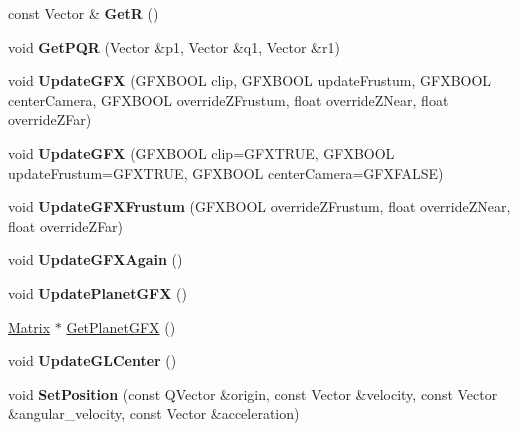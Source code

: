 \begin{DoxyCompactItemize}
\item 
const Vector \& {\bfseries GetR} ()\hypertarget{classCamera_a070588d0684768534f8bbbe9cfc80ce4}{}\label{classCamera_a070588d0684768534f8bbbe9cfc80ce4}

\item 
void {\bfseries Get\+P\+QR} (Vector \&p1, Vector \&q1, Vector \&r1)\hypertarget{classCamera_ad53fce5afb44f52fed1cbc04dcc78116}{}\label{classCamera_ad53fce5afb44f52fed1cbc04dcc78116}

\item 
void {\bfseries Update\+G\+FX} (G\+F\+X\+B\+O\+OL clip, G\+F\+X\+B\+O\+OL update\+Frustum, G\+F\+X\+B\+O\+OL center\+Camera, G\+F\+X\+B\+O\+OL override\+Z\+Frustum, float override\+Z\+Near, float override\+Z\+Far)\hypertarget{classCamera_a34033fc30cb7ab719872ae8e950e6f56}{}\label{classCamera_a34033fc30cb7ab719872ae8e950e6f56}

\item 
void {\bfseries Update\+G\+FX} (G\+F\+X\+B\+O\+OL clip=G\+F\+X\+T\+R\+UE, G\+F\+X\+B\+O\+OL update\+Frustum=G\+F\+X\+T\+R\+UE, G\+F\+X\+B\+O\+OL center\+Camera=G\+F\+X\+F\+A\+L\+SE)\hypertarget{classCamera_a4bd104f3c72ada744287bdef41bbf149}{}\label{classCamera_a4bd104f3c72ada744287bdef41bbf149}

\item 
void {\bfseries Update\+G\+F\+X\+Frustum} (G\+F\+X\+B\+O\+OL override\+Z\+Frustum, float override\+Z\+Near, float override\+Z\+Far)\hypertarget{classCamera_ab17457938679c559f7079798d1861fcf}{}\label{classCamera_ab17457938679c559f7079798d1861fcf}

\item 
void {\bfseries Update\+G\+F\+X\+Again} ()\hypertarget{classCamera_ae7b6b57f519565f4863b3293899bf625}{}\label{classCamera_ae7b6b57f519565f4863b3293899bf625}

\item 
void {\bfseries Update\+Planet\+G\+FX} ()\hypertarget{classCamera_a86aa1e55c74d1219cdac7b2de1f6c1a5}{}\label{classCamera_a86aa1e55c74d1219cdac7b2de1f6c1a5}

\item 
\hyperlink{classMatrix}{Matrix} $\ast$ \hyperlink{classCamera_a4263186b84618f0403eff92c8c147c0b}{Get\+Planet\+G\+FX} ()
\item 
void {\bfseries Update\+G\+L\+Center} ()\hypertarget{classCamera_a24e03f195cf366d41695d5b8900afd7d}{}\label{classCamera_a24e03f195cf366d41695d5b8900afd7d}

\item 
void {\bfseries Set\+Position} (const Q\+Vector \&origin, const Vector \&velocity, const Vector \&angular\+\_\+velocity, const Vector \&acceleration)\hypertarget{classCamera_a4f0575898ea040a2932702f3ac703be9}{}\label{classCamera_a4f0575898ea040a2932702f3ac703be9}


\end{DoxyCompactItemize}
